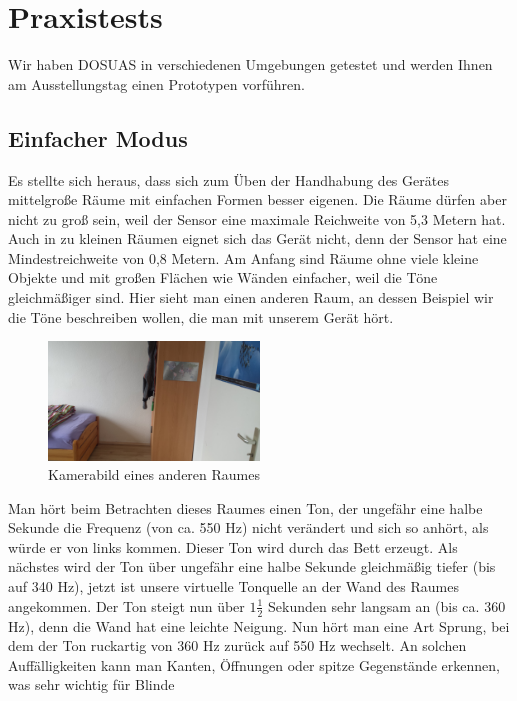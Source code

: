 \documentclass[a4paper,12pt,ngerman]{scrartcl}
\begin{document}
\newpage

\section{Praxistests} \label{testsAndResults}

Wir haben DOSUAS in verschiedenen Umgebungen getestet und werden Ihnen am Ausstellungstag einen Prototypen vorführen.

\subsection{Einfacher Modus}

Es stellte sich heraus, dass sich zum Üben der Handhabung des Gerätes mittelgroße Räume mit einfachen
Formen besser eigenen. Die Räume dürfen aber nicht zu groß sein, weil der Sensor eine maximale Reichweite
von 5,3 Metern hat. Auch in zu kleinen Räumen eignet sich das Gerät nicht, denn der Sensor hat eine  Mindestreichweite von 0,8 Metern. Am Anfang sind Räume ohne viele kleine Objekte und mit großen 
Flächen wie Wänden einfacher, weil die Töne gleichmäßiger sind.
Hier sieht man einen anderen Raum, an dessen Beispiel wir die Töne beschreiben wollen, die man
mit unserem Gerät hört.
\begin{figure}[H]
	\centering
	\includegraphics[angle=180,width=0.5\textwidth]{20180120_114953}
	\caption{Kamerabild eines anderen Raumes}
	\label{normal_picture}
\end{figure} \par
Man hört beim Betrachten dieses Raumes einen Ton, der ungefähr eine halbe Sekunde die Frequenz (von ca. 550 Hz) nicht verändert und sich so anhört, als würde er von links kommen. Dieser Ton wird durch das Bett
erzeugt. Als nächstes wird der Ton über ungefähr eine halbe Sekunde gleichmäßig tiefer (bis auf 340 Hz), 
jetzt ist unsere virtuelle Tonquelle an der Wand des Raumes angekommen. Der Ton steigt nun über $1\frac{1}{2}$ Sekunden sehr langsam an (bis ca. 360 Hz), denn die Wand hat eine leichte Neigung. 
Nun hört man eine Art Sprung, bei dem der Ton ruckartig von 360 Hz zurück auf 550 Hz wechselt. An solchen Auffälligkeiten kann man Kanten, Öffnungen oder spitze Gegenstände erkennen, was sehr wichtig für Blinde
\end{document}
